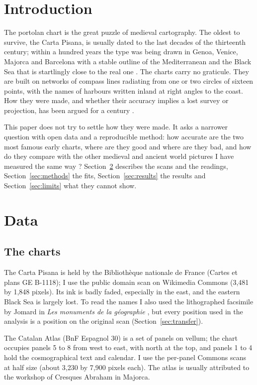\documentclass[11pt,a4paper]{article}
\begin{document}
\section{Introduction}
The portolan chart is the great puzzle of medieval cartography. The oldest to survive, the Carta Pisana, is usually dated to the last decades of the thirteenth century; within a hundred years the type was being drawn in Genoa, Venice, Majorca and Barcelona with a stable outline of the Mediterranean and the Black Sea that is startlingly close to the real one \citep{campbell1987}. The charts carry no graticule. They are built on networks of compass lines radiating from one or two circles of sixteen points, with the names of harbours written inland at right angles to the coast. How they were made, and whether their accuracy implies a lost survey or projection, has been argued for a century \citep{lanman1987,nicolai2016}.

This paper does not try to settle how they were made. It asks a narrower question with open data and a reproducible method: how accurate are the two most famous early charts, where are they good and where are they bad, and how do they compare with the other medieval and ancient world pictures I have measured the same way \citep{hotham_ptolemy,hotham_hereford,hotham_idrisi}? Section~\ref{sec:data} describes the scans and the readings, Section~\ref{sec:methods} the fits, Section~\ref{sec:results} the results and Section~\ref{sec:limits} what they cannot show.

\section{Data}\label{sec:data}
\subsection{The charts}
The Carta Pisana is held by the Biblioth\`eque nationale de France (Cartes et plans GE B-1118); I use the public domain scan on Wikimedia Commons (3,481 by 1,848 pixels). Its ink is badly faded, especially in the east, and the eastern Black Sea is largely lost. To read the names I also used the lithographed facsimile by Jomard in \textit{Les monuments de la g\'eographie} \citep{jomard}, but every position used in the analysis is a position on the original scan (Section~\ref{sec:transfer}).

The Catalan Atlas (BnF Espagnol 30) is a set of panels on vellum; the chart occupies panels 5 to 8 from west to east, with north at the top, and panels 1 to 4 hold the cosmographical text and calendar. I use the per-panel Commons scans at half size (about 3,230 by 7,900 pixels each). The atlas is usually attributed to the workshop of Cresques Abraham in Majorca.
\end{document}
